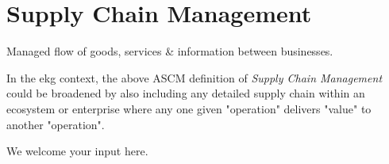 \section{Supply Chain Management}\label{sec:ekg-mm-a-3-3}

Managed flow of goods, services \& information between businesses.


\ekgmmContextSection

In the \gls{ekg} context, the above ASCM definition of \textit{Supply Chain Management} could be broadened
by also including any detailed supply chain within an ecosystem or enterprise where any one given "operation"
delivers "value" to another "operation".


We welcome your input here.

